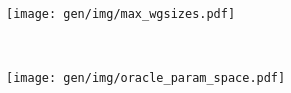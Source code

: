 \begin{subfigure}[t]{0.45\textwidth}
\centering
\texttt{[image: gen/img/max\_wgsizes.pdf]}
\vspace{-1.5em} %
\caption{}
\label{fig:max-wgsizes}
\end{subfigure}
~%
\begin{subfigure}[t]{0.45\textwidth}
\centering
\texttt{[image: gen/img/oracle\_param\_space.pdf]}
\vspace{-1.5em} %
\caption{}
\label{fig:oracle-wgsizes}
\end{subfigure}
